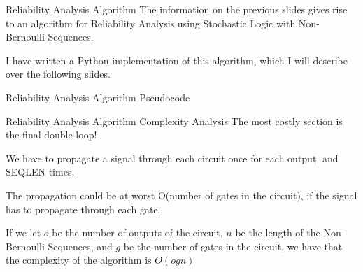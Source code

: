 \documentclass[12pt]{beamer}
\begin{document}
\begin{frame}{Reliability Analysis Algorithm}
The information on the previous slides gives rise to an algorithm for Reliability Analysis using Stochastic Logic with Non-Bernoulli Sequences.
\vspace{0.25cm}

I have written a Python implementation of this algorithm, which I will describe over the following slides.
\end{frame}

\begin{frame}[fragile]{Reliability Analysis Algorithm \small Pseudocode}

\end{frame}

\begin{frame}{Reliability Analysis Algorithm \small Complexity Analysis}
The most costly section is the final double loop!
\vspace{0.25cm}

We have to propagate a signal through each circuit once for each output, and SEQLEN times.
\vspace{0.25cm}

The propagation could be at worst O(number of gates in the circuit), if the signal has to propagate through each gate.
\vspace{0.25cm}

If we let $o$ be the number of outputs of the circuit, $n$ be the length of the Non-Bernoulli Sequences, and $g$ be the number of gates in the circuit, we have that the complexity of the algorithm is $O(ogn)$
\end{frame}
\end{document}
